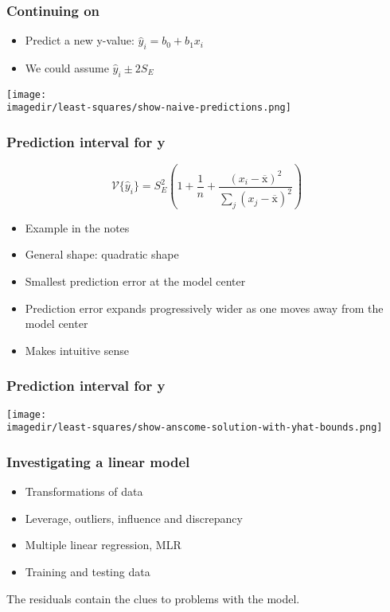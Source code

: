 \begin{frame}\frametitle{Continuing on}
	\begin{itemize}
		\item	Predict a new y-value: $\hat{y}_i = b_0 + b_1 x_i$
		\item	We could assume $\hat{y}_i \pm 2S_E$
	\end{itemize}
	\begin{center}
		\texttt{[image: \\imagedir/least-squares/show-naive-predictions.png]}
	\end{center}
\end{frame}

\begin{frame}\frametitle{Prediction interval for y}

	$$\mathcal{V}\{\hat{y}_i\} = S_E^2 \left(1 + \dfrac{1}{n} + \dfrac{(x_i - \overline{\mathrm{x}})^2}{\sum_j{\left( x_j - \overline{\mathrm{x}} \right)^2}}\right)$$
	\begin{itemize}
		\item	Example in the notes
		\item	General shape: quadratic shape
		\item	Smallest prediction error at the model center
		\item	Prediction error expands progressively wider as one moves away from the model center
		\item	Makes intuitive sense
	\end{itemize}
\end{frame}

\begin{frame}\frametitle{Prediction interval for y}
	\begin{center}
		\texttt{[image: \\imagedir/least-squares/show-anscome-solution-with-yhat-bounds.png]}
	\end{center}
\end{frame}

\begin{frame}\frametitle{Investigating a linear model}
	\begin{itemize}
		\item	Transformations of data
		\item	Leverage, outliers, influence and discrepancy
		\item	Multiple linear regression, MLR
		\item	Training and testing data
	\end{itemize}

	The residuals contain the clues to problems with the model.
\end{frame}

